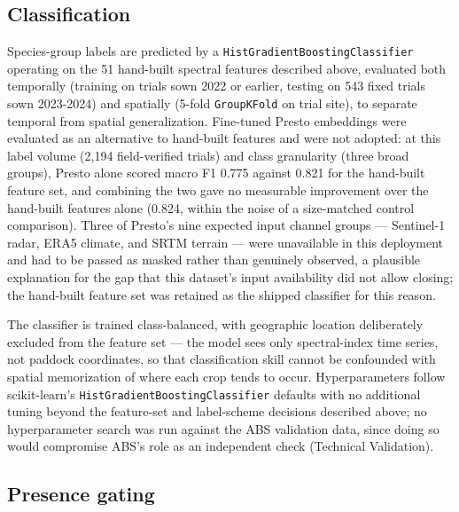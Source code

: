 \subsection*{Classification}\label{classification}

Species-group labels are predicted by a \texttt{HistGradientBoostingClassifier} operating on the 51 hand-built spectral features described above, evaluated both temporally (training on trials sown 2022 or earlier, testing on 543 fixed trials sown 2023-2024) and spatially (5-fold \texttt{GroupKFold} on trial site), to separate temporal from spatial generalization. Fine-tuned Presto embeddings \citep{tseng2024presto} were evaluated as an alternative to hand-built features and were not adopted: at this label volume (2,194 field-verified trials) and class granularity (three broad groups), Presto alone scored macro F1 0.775 against 0.821 for the hand-built feature set, and combining the two gave no measurable improvement over the hand-built features alone (0.824, within the noise of a size-matched control comparison). Three of Presto's nine expected input channel groups --- Sentinel-1 radar, ERA5 climate, and SRTM terrain --- were unavailable in this deployment and had to be passed as masked rather than genuinely observed, a plausible explanation for the gap that this dataset's input availability did not allow closing; the hand-built feature set was retained as the shipped classifier for this reason.

The classifier is trained class-balanced, with geographic location deliberately excluded from the feature set --- the model sees only spectral-index time series, not paddock coordinates, so that classification skill cannot be confounded with spatial memorization of where each crop tends to occur. Hyperparameters follow scikit-learn's \texttt{HistGradientBoostingClassifier} defaults with no additional tuning beyond the feature-set and label-scheme decisions described above; no hyperparameter search was run against the ABS validation data, since doing so would compromise ABS's role as an independent check (Technical Validation).

\subsection*{Presence gating}\label{presence-gating}

